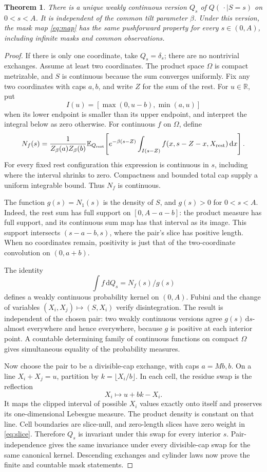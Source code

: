 \documentclass[11pt,a4paper]{article}
\newtheorem{theorem}{Theorem}[section]\newtheorem{lemma}[theorem]{Lemma}
\theoremstyle{remark}\newtheorem*{ednote}{Editorial note (ProveIt, 2026-10-01)}
\newcommand{\E}{\mathbb E}\newcommand{\N}{\mathbb N}\newcommand{\R}{\mathbb R}
\newcommand{\dd}{\,\mathrm d}\newcommand{\ii}{\mathrm i}
\begin{document}
\begin{theorem}\label{thm:exact}
There is a unique weakly continuous version $Q_s$ of $Q(\,\cdot\mid S=s)$ on $0<s<A$. It is independent of the common tilt parameter $\beta$. Under this version, the mask map \eqref{eq:map} has the same pushforward property for every $s\in(0,A)$, including infinite masks and common observations.
\end{theorem}
\begin{proof}
If there is only one coordinate, take $Q_s=\delta_s$; there are no nontrivial exchanges. Assume at least two coordinates. The product space $\Omega$ is compact metrizable, and $S$ is continuous because the sum converges uniformly. Fix any two coordinates with caps $a,b$, and write $Z$ for the sum of the rest. For $u\in\R$, put
\[
 I(u)=[\max(0,u-b),\min(a,u)]
\]
when its lower endpoint is smaller than its upper endpoint, and interpret the integral below as zero otherwise. For continuous $f$ on $\Omega$, define
\begin{equation}\label{eq:slice}
 N_f(s)=\frac{1}{Z_\beta(a)Z_\beta(b)}
 \E_{Q_{\rm rest}}\!\left[
 e^{-\beta(s-Z)}\int_{I(s-Z)}
 f(x,s-Z-x,X_{\rm rest})\dd x\right].
\end{equation}
For every fixed rest configuration this expression is continuous in $s$, including where the interval shrinks to zero. Compactness and bounded total cap supply a uniform integrable bound. Thus $N_f$ is continuous.

The function $g(s)=N_1(s)$ is the density of $S$, and $g(s)>0$ for $0<s<A$. Indeed, the rest sum has full support on $[0,A-a-b]$: the product measure has full support, and its continuous sum map has that interval as its image. This support intersects $(s-a-b,s)$, where the pair's slice has positive length. When no coordinates remain, positivity is just that of the two-coordinate convolution on $(0,a+b)$.

The identity
\[
 \int f\dd Q_s=N_f(s)/g(s)
\]
defines a weakly continuous probability kernel on $(0,A)$. Fubini and the change of variables $(X_i,X_j)\mapsto(S,X_i)$ verify disintegration. The result is independent of the chosen pair: two weakly continuous versions agree $g(s)\dd s$-almost everywhere and hence everywhere, because $g$ is positive at each interior point. A countable determining family of continuous functions on compact $\Omega$ gives simultaneous equality of the probability measures.

Now choose the pair to be a divisible-cap exchange, with caps $a=Mb,b$. On a line $X_i+X_j=u$, partition by $k=\lfloor X_i/b\rfloor$. In each cell, the residue swap is the reflection
\[
 X_i\longmapsto u+bk-X_i.
\]
It maps the clipped interval of possible $X_i$ values exactly onto itself and preserves its one-dimensional Lebesgue measure. The product density is constant on that line. Cell boundaries are slice-null, and zero-length slices have zero weight in \eqref{eq:slice}. Therefore $Q_s$ is invariant under this swap for every interior $s$. Pair-independence gives the same invariance under every divisible-cap swap for the same canonical kernel. Descending exchanges and cylinder laws now prove the finite and countable mask statements.


\end{proof}
\end{document}
